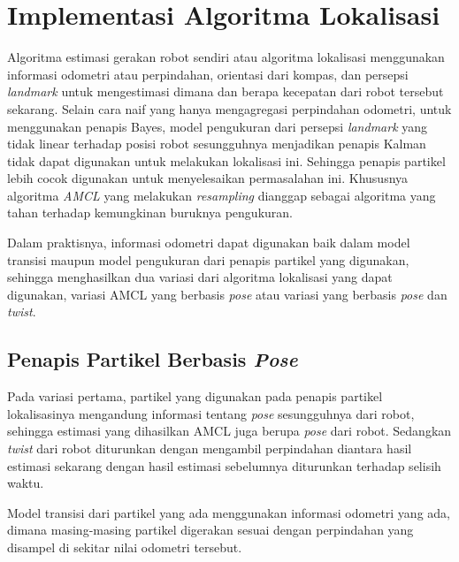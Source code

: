 \section{Implementasi Algoritma Lokalisasi}

Algoritma estimasi gerakan robot sendiri atau algoritma lokalisasi menggunakan informasi odometri atau perpindahan, orientasi dari kompas, dan persepsi \textit{landmark} untuk mengestimasi dimana dan berapa kecepatan dari robot tersebut sekarang. Selain cara naif yang hanya mengagregasi perpindahan odometri, untuk menggunakan penapis Bayes, model pengukuran dari persepsi \textit{landmark} yang tidak linear terhadap posisi robot sesungguhnya menjadikan penapis Kalman tidak dapat digunakan untuk melakukan lokalisasi ini. Sehingga penapis partikel lebih cocok digunakan untuk menyelesaikan permasalahan ini. Khususnya algoritma \textit{AMCL} yang melakukan \textit{resampling} dianggap sebagai algoritma yang tahan terhadap kemungkinan buruknya pengukuran.

Dalam praktisnya, informasi odometri dapat digunakan baik dalam model transisi maupun model pengukuran dari penapis partikel yang digunakan, sehingga menghasilkan dua variasi dari algoritma lokalisasi yang dapat digunakan, variasi AMCL yang berbasis \textit{pose} atau variasi yang berbasis \textit{pose} dan \textit{twist}.

\subsection{Penapis Partikel Berbasis \textit{Pose}}

Pada variasi pertama, partikel yang digunakan pada penapis partikel lokalisasinya mengandung informasi tentang \textit{pose} sesungguhnya dari robot, sehingga estimasi yang dihasilkan AMCL juga berupa \textit{pose} dari robot. Sedangkan \textit{twist} dari robot diturunkan dengan mengambil perpindahan diantara hasil estimasi sekarang dengan hasil estimasi sebelumnya diturunkan terhadap selisih waktu.

Model transisi dari partikel yang ada menggunakan informasi odometri yang ada, dimana masing-masing partikel digerakan sesuai dengan perpindahan yang disampel di sekitar nilai odometri tersebut.

